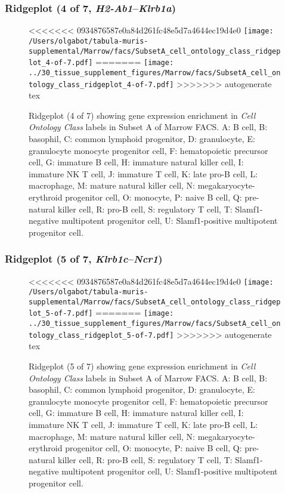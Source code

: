\clearpage

\subsubsection{Ridgeplot (4 of 7, \emph{H2-Ab1}--\emph{Klrb1a})}
\begin{figure}[h]
\centering
<<<<<<< 0934876587e0a84d261fc48e5d7a4644ec19d4e0
\texttt{[image: /Users/olgabot/tabula-muris-supplemental/Marrow/facs/SubsetA\_cell\_ontology\_class\_ridgeplot\_4-of-7.pdf]}
=======
\texttt{[image: ../30\_tissue\_supplement\_figures/Marrow/facs/SubsetA\_cell\_ontology\_class\_ridgeplot\_4-of-7.pdf]}
>>>>>>> autogenerate tex

\caption{ Ridgeplot (4 of 7)  showing gene expression enrichment in \emph{Cell Ontology Class} labels in Subset A of Marrow FACS. A: B cell, B: basophil, C: common lymphoid progenitor, D: granulocyte, E: granulocyte monocyte progenitor cell, F: hematopoietic precursor cell, G: immature B cell, H: immature natural killer cell, I: immature NK T cell, J: immature T cell, K: late pro-B cell, L: macrophage, M: mature natural killer cell, N: megakaryocyte-erythroid progenitor cell, O: monocyte, P: naive B cell, Q: pre-natural killer cell, R: pro-B cell, S: regulatory T cell, T: Slamf1-negative multipotent progenitor cell, U: Slamf1-positive multipotent progenitor cell.}
\end{figure}


\clearpage

\subsubsection{Ridgeplot (5 of 7, \emph{Klrb1c}--\emph{Ncr1})}
\begin{figure}[h]
\centering
<<<<<<< 0934876587e0a84d261fc48e5d7a4644ec19d4e0
\texttt{[image: /Users/olgabot/tabula-muris-supplemental/Marrow/facs/SubsetA\_cell\_ontology\_class\_ridgeplot\_5-of-7.pdf]}
=======
\texttt{[image: ../30\_tissue\_supplement\_figures/Marrow/facs/SubsetA\_cell\_ontology\_class\_ridgeplot\_5-of-7.pdf]}
>>>>>>> autogenerate tex

\caption{ Ridgeplot (5 of 7)  showing gene expression enrichment in \emph{Cell Ontology Class} labels in Subset A of Marrow FACS. A: B cell, B: basophil, C: common lymphoid progenitor, D: granulocyte, E: granulocyte monocyte progenitor cell, F: hematopoietic precursor cell, G: immature B cell, H: immature natural killer cell, I: immature NK T cell, J: immature T cell, K: late pro-B cell, L: macrophage, M: mature natural killer cell, N: megakaryocyte-erythroid progenitor cell, O: monocyte, P: naive B cell, Q: pre-natural killer cell, R: pro-B cell, S: regulatory T cell, T: Slamf1-negative multipotent progenitor cell, U: Slamf1-positive multipotent progenitor cell.}
\end{figure}


